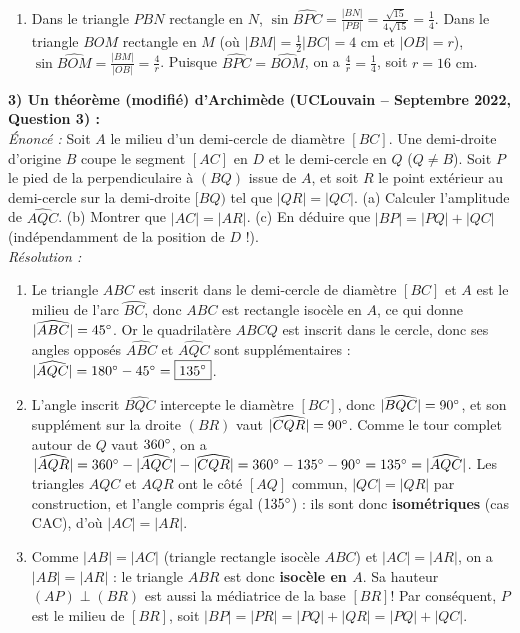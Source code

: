 \begin{exemple}
\begin{enumerate}[label=(\alph*)]
    \item Dans le triangle $PBN$ rectangle en $N$, $\sin\widehat{BPC} = \frac{|BN|}{|PB|} = \frac{\sqrt{15}}{4\sqrt{15}} = \frac{1}{4}$. Dans le triangle $BOM$ rectangle en $M$ (où $|BM| = \frac{1}{2}|BC| = 4\text{ cm}$ et $|OB| = r$), $\sin\widehat{BOM} = \frac{|BM|}{|OB|} = \frac{4}{r}$. Puisque $\widehat{BPC} = \widehat{BOM}$, on a $\frac{4}{r} = \frac{1}{4}$, soit $r = \boxed{16\text{ cm}}$.
\end{enumerate}

\medskip
\textbf{3) Un théorème (modifié) d'Archimède (UCLouvain -- Septembre 2022, Question 3) :}\\
\emph{Énoncé :} Soit $A$ le milieu d'un demi-cercle de diamètre $[BC]$. Une demi-droite d'origine $B$ coupe le segment $[AC]$ en $D$ et le demi-cercle en $Q$ ($Q \neq B$). Soit $P$ le pied de la perpendiculaire à $(BQ)$ issue de $A$, et soit $R$ le point extérieur au demi-cercle sur la demi-droite $[BQ)$ tel que $|QR| = |QC|$. (a) Calculer l'amplitude de $\widehat{AQC}$. (b) Montrer que $|AC| = |AR|$. (c) En déduire que $|BP| = |PQ| + |QC|$ (indépendamment de la position de $D$ !).\\
\emph{Résolution :}
\begin{enumerate}[label=(\alph*)]
    \item Le triangle $ABC$ est inscrit dans le demi-cercle de diamètre $[BC]$ et $A$ est le milieu de l'arc $\wideparen{BC}$, donc $ABC$ est rectangle isocèle en $A$, ce qui donne $|\widehat{ABC}| = 45\degree$. Or le quadrilatère $ABCQ$ est inscrit dans le cercle, donc ses angles opposés $\widehat{ABC}$ et $\widehat{AQC}$ sont supplémentaires : $|\widehat{AQC}| = 180\degree - 45\degree = \boxed{135\degree}$.
    \item L'angle inscrit $\widehat{BQC}$ intercepte le diamètre $[BC]$, donc $|\widehat{BQC}| = 90\degree$, et son supplément sur la droite $(BR)$ vaut $|\widehat{CQR}| = 90\degree$. Comme le tour complet autour de $Q$ vaut $360\degree$, on a $|\widehat{AQR}| = 360\degree - |\widehat{AQC}| - |\widehat{CQR}| = 360\degree - 135\degree - 90\degree = 135\degree = |\widehat{AQC}|$. Les triangles $AQC$ et $AQR$ ont le côté $[AQ]$ commun, $|QC| = |QR|$ par construction, et l'angle compris égal ($135\degree$) : ils sont donc \textbf{isométriques} (cas CAC), d'où $|AC| = |AR|$.
    \item Comme $|AB| = |AC|$ (triangle rectangle isocèle $ABC$) et $|AC| = |AR|$, on a $|AB| = |AR|$ : le triangle $ABR$ est donc \textbf{isocèle en $A$}. Sa hauteur $(AP) \perp (BR)$ est aussi la médiatrice de la base $[BR]$! Par conséquent, $P$ est le milieu de $[BR]$, soit $|BP| = |PR| = |PQ| + |QR| = |PQ| + |QC|$.
\end{enumerate}
\end{exemple}

